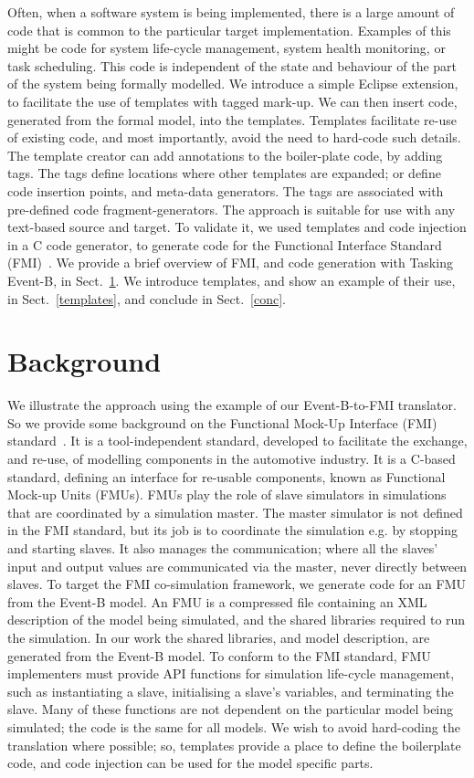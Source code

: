\documentclass{llncs}%
\begin{document}
Often, when a software system is being implemented, there is a large amount of code that is common to the particular target implementation. Examples of this might be code for system life-cycle management, system health monitoring, or task scheduling. This code is independent of the state and behaviour of the part of the system being formally modelled. We introduce a simple Eclipse extension, to facilitate the use of templates with tagged mark-up. We can then insert  code, generated from the formal model,  into the templates. Templates facilitate re-use of existing code, and most importantly, avoid the need to hard-code such details. The template creator can add annotations to the boiler-plate code, by adding tags. The tags define locations where other templates are expanded; or define code insertion points, and meta-data generators. The tags are associated with pre-defined code fragment-generators. The approach is suitable for use with any text-based source and target. To validate it, we used templates and code injection in a C code generator, to generate code for the Functional Interface Standard (FMI)~\cite{FMISTD}. We provide a brief overview of FMI, and code generation with Tasking Event-B, in Sect.~\ref{Background}. We introduce templates, and show an example of their use, in Sect.~\ref{templates}, and conclude in Sect.~\ref{conc}.
%
%
\section{Background}\label{Background}
%
We illustrate the approach using the example of our Event-B-to-FMI translator. So we provide some background on the Functional Mock-Up Interface (FMI) standard~\cite{FMISTD}. It is a tool-independent standard, developed to facilitate the exchange, and re-use, of modelling components in the automotive industry. It is a C-based standard, defining an interface for re-usable components, known as Functional Mock-up Units (FMUs). FMUs play the role of slave simulators in simulations that are coordinated by a simulation master. The master simulator is not defined in the FMI standard, but its job is to coordinate the simulation e.g. by stopping and starting slaves. It also manages the communication; where all the slaves' input and output values are communicated via the master, never directly between slaves. To target the FMI co-simulation framework, we generate code for an FMU from the Event-B model. An FMU is a compressed file containing an XML description of the model being simulated, and the shared libraries required to run the simulation. In our work the shared libraries, and model description, are generated from the Event-B model. To conform to the FMI standard, FMU implementers must provide API functions for simulation life-cycle management, such as instantiating a slave, initialising a slave's variables, and terminating the slave. Many of these functions are not dependent on the particular model being simulated; the code is the same for all models. We wish to avoid hard-coding the translation where possible; so, templates provide a place to define the boilerplate code, and code injection can be used for the model specific parts.    
\end{document}
